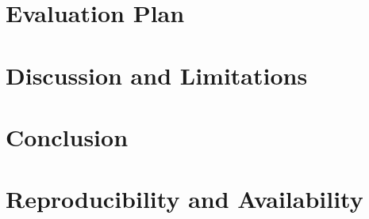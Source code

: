 \documentclass[11pt]{article}
\begin{document}
\section{Evaluation Plan}\label{sec:eval}


\section{Discussion and Limitations}\label{sec:discussion}


\section{Conclusion}\label{sec:conclusion}


\section*{Reproducibility and Availability}\label{sec:repro}




\end{document}
